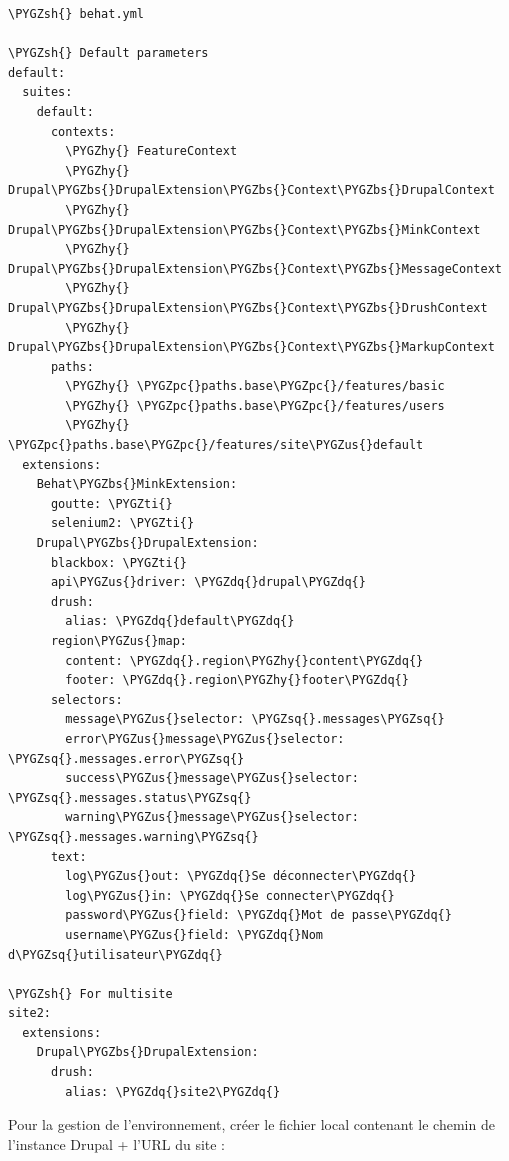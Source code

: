 \documentclass[a4paper,11pt,french]{rtdsphinxmanual}
\def\PYGZbs{\char`\\}
\def\PYGZus{\char`\_}
\def\PYGZsh{\char`\#}
\def\PYGZpc{\char`\%}
\def\PYGZhy{\char`\-}
\def\PYGZsq{\char`\'}
\def\PYGZdq{\char`\"}
\def\PYGZti{\char`\~}
\renewcommand\PYGZsq{\textquotesingle}
\begin{document}
\begin{Verbatim}[commandchars=\\\{\}]
\PYGZsh{} behat.yml

\PYGZsh{} Default parameters
default:
  suites:
    default:
      contexts:
        \PYGZhy{} FeatureContext
        \PYGZhy{} Drupal\PYGZbs{}DrupalExtension\PYGZbs{}Context\PYGZbs{}DrupalContext
        \PYGZhy{} Drupal\PYGZbs{}DrupalExtension\PYGZbs{}Context\PYGZbs{}MinkContext
        \PYGZhy{} Drupal\PYGZbs{}DrupalExtension\PYGZbs{}Context\PYGZbs{}MessageContext
        \PYGZhy{} Drupal\PYGZbs{}DrupalExtension\PYGZbs{}Context\PYGZbs{}DrushContext
        \PYGZhy{} Drupal\PYGZbs{}DrupalExtension\PYGZbs{}Context\PYGZbs{}MarkupContext
      paths:
        \PYGZhy{} \PYGZpc{}paths.base\PYGZpc{}/features/basic
        \PYGZhy{} \PYGZpc{}paths.base\PYGZpc{}/features/users
        \PYGZhy{} \PYGZpc{}paths.base\PYGZpc{}/features/site\PYGZus{}default
  extensions:
    Behat\PYGZbs{}MinkExtension:
      goutte: \PYGZti{}
      selenium2: \PYGZti{}
    Drupal\PYGZbs{}DrupalExtension:
      blackbox: \PYGZti{}
      api\PYGZus{}driver: \PYGZdq{}drupal\PYGZdq{}
      drush:
        alias: \PYGZdq{}default\PYGZdq{}
      region\PYGZus{}map:
        content: \PYGZdq{}.region\PYGZhy{}content\PYGZdq{}
        footer: \PYGZdq{}.region\PYGZhy{}footer\PYGZdq{}
      selectors:
        message\PYGZus{}selector: \PYGZsq{}.messages\PYGZsq{}
        error\PYGZus{}message\PYGZus{}selector: \PYGZsq{}.messages.error\PYGZsq{}
        success\PYGZus{}message\PYGZus{}selector: \PYGZsq{}.messages.status\PYGZsq{}
        warning\PYGZus{}message\PYGZus{}selector: \PYGZsq{}.messages.warning\PYGZsq{}
      text:
        log\PYGZus{}out: \PYGZdq{}Se déconnecter\PYGZdq{}
        log\PYGZus{}in: \PYGZdq{}Se connecter\PYGZdq{}
        password\PYGZus{}field: \PYGZdq{}Mot de passe\PYGZdq{}
        username\PYGZus{}field: \PYGZdq{}Nom d\PYGZsq{}utilisateur\PYGZdq{}

\PYGZsh{} For multisite
site2:
  extensions:
    Drupal\PYGZbs{}DrupalExtension:
      drush:
        alias: \PYGZdq{}site2\PYGZdq{}
\end{Verbatim}

Pour la gestion de l'environnement, créer le fichier local contenant le chemin de l'instance Drupal + l'URL du site :
\end{document}
